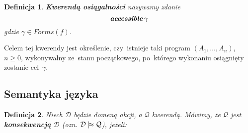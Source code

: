 \documentclass[11pt,a4paper]{article}
\newtheorem{defn}{Definicja}
\DeclareMathOperator{\Accessible}{\textbf{\textit{accessible}}}
\def\consequence{\mathrel|\joinrel\approx}
\begin{document}
    \begin{defn}
        \textbf{Kwerendą osiągalności} nazywamy zdanie
        $$ \Accessible \gamma $$
        gdzie $\gamma \in Forms(f)$.
    \end{defn}
    
    Celem tej kwerendy jest określenie, czy~istnieje taki program $(A_1, \dots, A_n)$, $n \geq 0$, wykonywalny ze~stanu początkowego, po~którego wykonaniu osiągnięty zostanie cel~$\gamma$.

\subsection{Semantyka języka}

\begin{defn}
    Niech $\mathcal{D}$ będzie domeną akcji, a $\mathcal{Q}$ kwerendą. 
    Mówimy, że $\mathcal{Q}$ jest \textbf{konsekwencją} $\mathcal{D}$ (ozn. $\mathcal{D} \consequence \mathcal{Q}$), jeżeli:


\end{defn}
\end{document}

